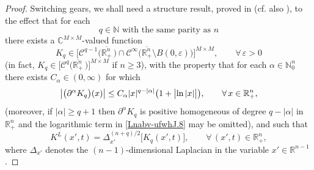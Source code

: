 \documentclass[11pt,reqno]{amsart}
\numberwithin{equation}{section}
\theoremstyle{remark}
\begin{document}
\begin{proof}
Switching gears, we shall need a structure result, proved in 
\cite[pp.\,56--57, and Lemma~4.1 on p.\,58]{ADNII} 
(cf. also \cite[pp.\,636--637]{ADNI}), to the effect that for each 
%
\begin{equation}\label{ha-GVVC-v6bu}
\text{$q\in{\mathbb{N}}$ with the same parity as $n$} 
\end{equation}
%
there exists a ${\mathbb{C}}^{M\times M}$-valued function
%
\begin{equation}\label{Lnabv-ufwhJ.7}
K_q\in\big[{\mathscr{C}}^{q-1}\big(\overline{{\mathbb{R}}^n_{+}}\,\big)
\cap{\mathscr{C}}^{\infty}\big(\overline{{\mathbb{R}}^n_{+}}
\setminus B(0,\varepsilon)\big)\big]^{M\times M},\qquad\forall\,\varepsilon>0
\end{equation}
%
(in fact, $K_q\in\big[{\mathscr{C}}^{q}\big(\overline{{\mathbb{R}}^n_{+}}\,\big)\big]^{M\times M}$ 
if $n\geq 3$), with the property that for each $\alpha\in{\mathbb{N}}_0^n$ 
there exists $C_\alpha\in(0,\infty)$ for which 
%
\begin{equation}\label{Lnabv-ufwhJ.8}
\big|\big(\partial^\alpha K_q\big)(x)\big|\leq C_\alpha |x|^{q-|\alpha|}
\big(1+\big|{\rm ln}\,|x|\big|\big),\qquad\forall\,x\in{\mathbb{R}}^n_{+},
\end{equation}
%
(moreover, if $|\alpha|\geq q+1$ then $\partial^\alpha K_q$ is positive homogeneous of degree $q-|\alpha|$ in ${\mathbb{R}}^n_{+}$ 
and the logarithmic term in \eqref{Lnabv-ufwhJ.8} may be omitted), and such that 
%
\begin{equation}\label{Lnabv-ufwhJ.9}
K^L(x',t)=\Delta_{x'}^{(n+q)/2}\big[K_q(x',t)\big],\qquad\forall\,(x',t)\in{\mathbb{R}}^n_{+},
\end{equation}
%
where $\Delta_{x'}$ denotes the $(n-1)$-dimensional Laplacian in the variable $x'\in{\mathbb{R}}^{n-1}$.


\end{proof}
\end{document}

